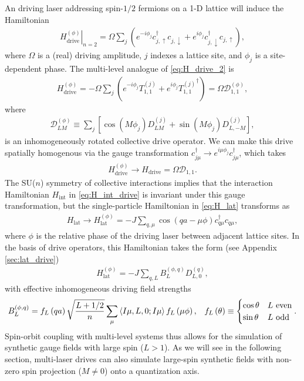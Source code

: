 \documentclass[nofootinbib,notitlepage,11pt]{revtex4-2}
\renewcommand{\t}{\text} %
\newcommand{\f}[2]{\dfrac{#1}{#2}} %
\newcommand{\p}[1]{\left(#1\right)} %
\renewcommand{\sp}[1]{\left[#1\right]} %
\newcommand{\bk}{\Braket} %
\newcommand{\1}{\mathds{1}}
\newcommand{\up}{\uparrow}
\newcommand{\dn}{\downarrow}
\newcommand{\D}{\mathcal{D}}
\begin{document}
An driving laser addressing spin-$1/2$ fermions on a 1-D lattice will
induce the Hamiltonian
\begin{align}
  \left. H_{\t{drive}}^{(\phi)} \right|_{n=2}
  = \Omega \sum_j
  \p{e^{-i\phi_j} c_{j,\up}^\dag c_{j,\dn}
    + e^{i\phi_j} c_{j,\dn}^\dag c_{j,\up}},
  \label{eq:H_drive_2}
\end{align}
where $\Omega$ is a (real) driving amplitude, $j$ indexes a lattice
site, and $\phi_j$ is a site-dependent phase.  The multi-level
analogue of \eqref{eq:H_drive_2} is
\begin{align}
  H_{\t{drive}}^{(\phi)}
  = -\Omega \sum_j \p{e^{-i\phi_j} T_{1,1}^{(j)}
    + e^{i\phi_j} {T_{1,1}^{(j)}}^\dag}
  = \Omega \D_{1,1}^{(\phi)},
  \label{eq:H_drive}
\end{align}
where
\begin{align}
  \D_{LM}^{(\phi)}
  \equiv \sum_j \sp{\cos\p{M\phi_j} D_{LM}^{(j)}
    + \sin\p{M\phi_j} D_{L,-M}^{(j)}},
  \label{eq:drive_rot}
\end{align}
is an inhomogeneously rotated collective drive operator.  We can make
this drive spatially homogenous via the gauge transformation
$c_{j\mu}^\dag \to e^{i\mu\phi_j} c_{j\mu}^\dag$, which takes
\begin{align}
  H_{\t{drive}}^{(\phi)} \to H_{\t{drive}} = \Omega \D_{1,1}.
\end{align}
The SU($n$) symmetry of collective interactions implies that the
interaction Hamiltonian $H_{\t{int}}$ in \eqref{eq:H_int_drive} is
invariant under this gauge transformation, but the single-particle
Hamiltonian in \eqref{eq:H_lat} transforms as
\begin{align}
  H_{\t{lat}}
  \to H_{\t{lat}}^{(\phi)}
  = -J \sum_{q,\mu} \cos\p{qa-\mu\phi} c_{q\mu}^\dag c_{q\mu},
  \label{eq:H_lat_SOC}
\end{align}
where $\phi$ is the relative phase of the driving laser between
adjacent lattice sites.  In the basis of drive operators, this
Hamiltonian takes the form (see Appendix \ref{sec:lat_drive})
\begin{align}
  H_{\t{lat}}^{(\phi)} = -J \sum_{q,L} B_L^{(\phi,q)} D_{L,0}^{(q)},
  \label{eq:H_lat_drive}
\end{align}
with effective inhomogeneous driving field strengths
\begin{align}
  B_L^{(\phi,q)} = f_L\p{qa} \sqrt{\f{L+1/2}{n}}
  \sum_\mu \bk{I\mu,L,0;I\mu} f_L\p{\mu\phi},
  &&
  f_L\p{\theta} \equiv
  \begin{cases}
    \cos\theta & L~\t{even} \\
    \sin\theta & L~\t{odd}
  \end{cases}.
\end{align}
Spin-orbit coupling with multi-level systems thus allows for the
simulation of synthetic gauge fields with large spin ($L>1$).  As we
will see in the following section, multi-laser drives can also
simulate large-spin synthetic fields with non-zero spin projection
($M\ne0$) onto a quantization axis.
\end{document}
